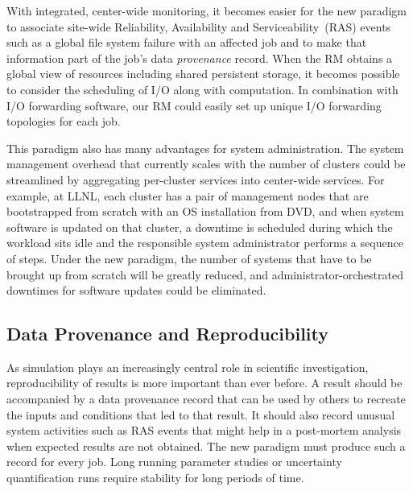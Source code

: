 \documentclass{article}
\begin{document}
With integrated, center-wide monitoring, it becomes easier
for the new paradigm to associate site-wide Reliability, Availability and Serviceability~(RAS) 
events such as a global file system
failure with an affected job and to make that information part of
the job's data {\em provenance} record. When the RM obtains a global view of
resources including shared persistent storage, it becomes possible to
consider the scheduling of I/O along with computation. In combination with
I/O forwarding software, our RM could easily set up unique I/O forwarding
topologies for each job.

This paradigm also has many advantages for system administration.
The system management overhead that currently scales with the number of clusters
could be streamlined by aggregating per-cluster services into center-wide
services. For example, at LLNL, each cluster has a pair of management
nodes that are bootstrapped from scratch with an OS installation from DVD,
and when system software is updated on that cluster, a downtime is
scheduled during which the workload sits idle and the responsible system
administrator performs a sequence of steps. Under the new paradigm, the
number of systems that have to be brought up from scratch will be
greatly reduced, and administrator-orchestrated downtimes for software
updates could be eliminated. 


\subsection{Data Provenance and Reproducibility}

As simulation plays an increasingly central role in scientific
investigation, reproducibility of results is more important than ever
before. A result should be accompanied by a data provenance record that
can be used by others to recreate the inputs and conditions that led to
that result. It should also record unusual system activities 
such as RAS events that might help in a post-mortem analysis 
when expected results are not obtained.
The new paradigm must produce such a record for every job.
Long running parameter studies or uncertainty quantification runs
require stability for long periods of time. 
%
\end{document}
